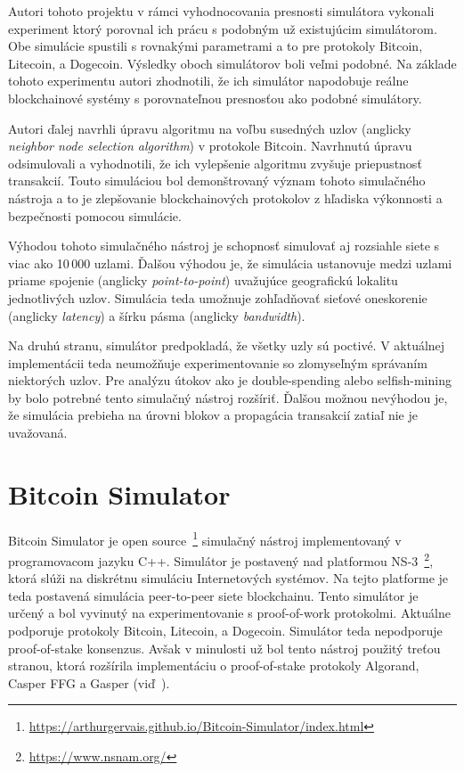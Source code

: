 Autori tohoto projektu v rámci vyhodnocovania presnosti simulátora vykonali experiment ktorý porovnal ich prácu s podobným už existujúcim simulátorom. Obe simulácie spustili s rovnakými parametrami a to pre protokoly Bitcoin, Litecoin, a Dogecoin. Výsledky oboch simulátorov boli veľmi podobné. Na základe tohoto experimentu autori zhodnotili, že ich simulátor napodobuje reálne blockchainové systémy s porovnateľnou presnosťou ako podobné simulátory.

Autori ďalej navrhli úpravu algoritmu na voľbu susedných uzlov (anglicky \textit{neighbor node selection algorithm}) v protokole Bitcoin. Navrhnutú úpravu odsimulovali a vyhodnotili, že ich vylepšenie algoritmu zvyšuje priepustnosť transakcií. Touto simuláciou bol demonštrovaný význam tohoto simulačného nástroja a to je zlepšovanie blockchainových protokolov z hľadiska výkonnosti a bezpečnosti pomocou simulácie.~\cite{simblockWp}

Výhodou tohoto simulačného nástroj je schopnosť simulovať aj rozsiahle siete s viac ako 10\,000 uzlami. Ďalšou výhodou je, že simulácia ustanovuje medzi uzlami priame spojenie (anglicky \textit{point-to-point}) uvažujúce geografickú lokalitu jednotlivých uzlov. Simulácia teda umožnuje zohľadňovať sieťové oneskorenie (anglicky \textit{latency}) a šírku pásma (anglicky \textit{bandwidth}). 

Na druhú stranu, simulátor predpokladá, že všetky uzly sú poctivé. V aktuálnej implementácii teda neumožňuje experimentovanie so zlomyseľným správaním niektorých uzlov. Pre analýzu útokov ako je double-spending alebo selfish-mining by bolo potrebné tento simulačný nástroj rozšíriť. Ďalšou možnou nevýhodou je, že simulácia prebieha na úrovni blokov a propagácia transakcií zatiaľ nie je uvažovaná.~\cite{fanPerfEval}

\section{Bitcoin Simulator}

Bitcoin Simulator je open source~\footnote{\url{https://arthurgervais.github.io/Bitcoin-Simulator/index.html}} simulačný nástroj implementovaný v programovacom jazyku C++. Simulátor je postavený nad platformou NS-3~\footnote{\url{https://www.nsnam.org/}}, ktorá slúži na diskrétnu simuláciu Internetových systémov. Na tejto platforme je teda postavená simulácia peer-to-peer siete blockchainu. Tento simulátor je určený a bol vyvinutý na experimentovanie s proof-of-work protokolmi. Aktuálne podporuje protokoly Bitcoin, Litecoin, a Dogecoin. Simulátor teda nepodporuje proof-of-stake konsenzus. Avšak v minulosti už bol tento nástroj použitý treťou stranou, ktorá rozšírila implementáciu o proof-of-stake protokoly Algorand, Casper FFG a Gasper (viď~\cite{borcikDp}). 

